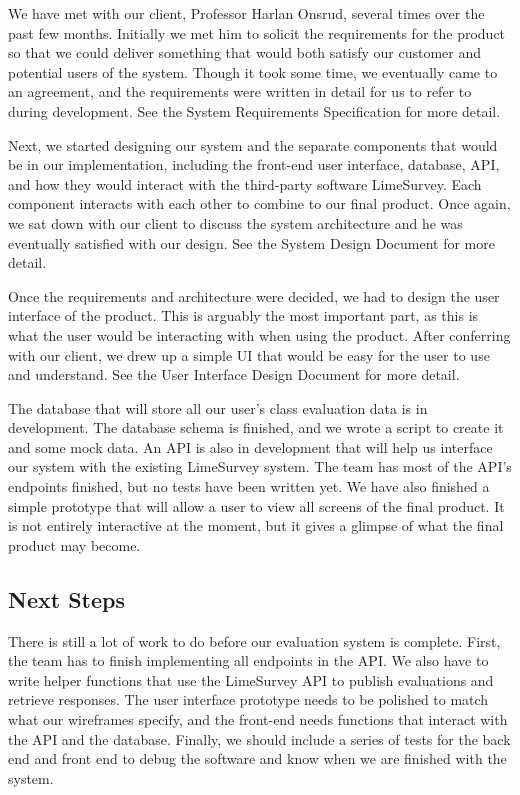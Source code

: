 \documentclass{article}
\begin{document}
We have met with our client, Professor Harlan Onsrud, several times over the past few months. Initially we met him to solicit the requirements for the product so that we could deliver something that would both satisfy our customer and potential users of the system. Though it took some time, we eventually came to an agreement, and the requirements were written in detail for us to refer to during development. See the System Requirements Specification for more detail.
	
Next, we started designing our system and the separate components that would be in our implementation, including the front-end user interface, database, API, and how they would interact with the third-party software LimeSurvey. Each component interacts with each other to combine to our final product. Once again, we sat down with our client to discuss the system architecture and he was eventually satisfied with our design. See the System Design Document for more detail.

Once the requirements and architecture were decided, we had to design the user interface of the product. This is arguably the most important part, as this is what the user would be interacting with when using the product. After conferring with our client, we drew up a simple UI that would be easy for the user to use and understand. See the User Interface Design Document for more detail.

The database that will store all our user's class evaluation data is in development. The database schema is finished, and we wrote a script to create it and some mock data. An API is also in development that will help us interface our system with the existing LimeSurvey system. The team has most of the API's endpoints finished, but no tests have been written yet. We have also finished a simple prototype that will allow a user to view all screens of the final product. It is not entirely interactive at the moment, but it gives a glimpse of what the final product may become.

\subsection{Next Steps}

There is still a lot of work to do before our evaluation system is complete. First, the team has to finish implementing all endpoints in the API. We also have to write helper functions that use the LimeSurvey API to publish evaluations and retrieve responses. The user interface prototype needs to be polished to match what our wireframes specify, and the front-end needs functions that interact with the API and the database. Finally, we should include a series of tests for the back end and front end to debug the software and know when we are finished with the system.
\end{document}
